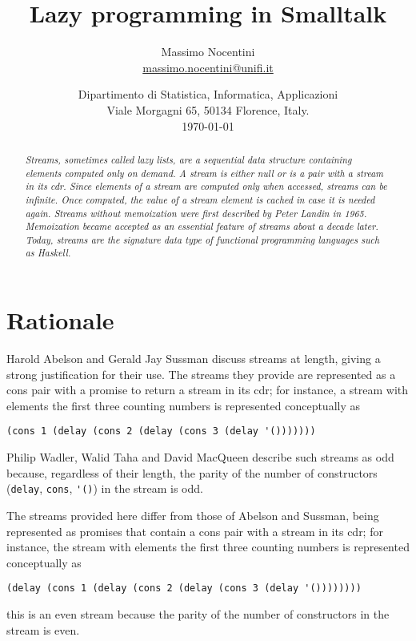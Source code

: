 \documentclass[a4paper]{article}
\begin{document}
\title{Lazy programming in Smalltalk}
\author{Massimo Nocentini\\{\footnotesize\url{massimo.nocentini@unifi.it}}}
\date{\small Dipartimento di Statistica, Informatica, Applicazioni\\Viale Morgagni 65, 50134 Florence, Italy.\\\today}

\maketitle

\begin{abstract}
\textit{Streams, sometimes called lazy lists, are a sequential data structure containing elements
computed only on demand. A stream is either null or is a pair with a stream in its cdr. Since
elements of a stream are computed only when accessed, streams can be infinite. Once computed, the
value of a stream element is cached in case it is needed again. Streams without memoization were
first described by Peter Landin in 1965. Memoization became accepted as an essential feature of
streams about a decade later. Today, streams are the signature data type of functional
programming languages such as Haskell.}
\end{abstract}

\section{Rationale}

\color{gray}
Harold Abelson and Gerald Jay Sussman discuss streams at length, giving a strong justification for their use. The streams they provide are represented as a cons pair with a promise to return a stream in its cdr; for instance, a stream with elements the first three counting numbers is represented conceptually as 
\begin{Verbatim}[fontsize=\small]
(cons 1 (delay (cons 2 (delay (cons 3 (delay '()))))))
\end{Verbatim}
Philip Wadler, Walid Taha and David MacQueen describe such streams as odd because, regardless of their length, the parity of the number of constructors (\Verb|delay|, \Verb|cons|, \Verb|'()|) in the stream is odd.

The streams provided here differ from those of Abelson and Sussman, being represented as promises that contain a cons pair with a stream in its cdr; for instance, the stream with elements the first three counting numbers is represented conceptually as 
\begin{Verbatim}[fontsize=\small]
(delay (cons 1 (delay (cons 2 (delay (cons 3 (delay '())))))))
\end{Verbatim}
this is an even stream because the parity of the number of constructors in the stream is even.
\end{document}
